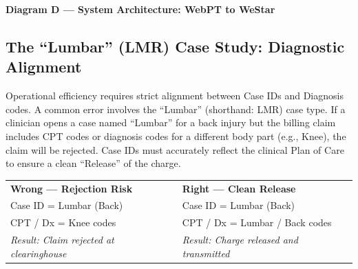 \documentclass[11pt,a4paper]{article}
\begin{document}
\vspace{0.4em}
\begin{center}
\textbf{\color{AccentTeal}Diagram D --- System Architecture: WebPT to WeStar}\\[0.5em]
\end{center}

\subsection{The ``Lumbar'' (LMR) Case Study: Diagnostic Alignment}

Operational efficiency requires strict alignment between Case IDs and Diagnosis codes. A common error involves the ``Lumbar'' (shorthand: LMR) case type. If a clinician opens a case named ``Lumbar'' for a back injury but the billing claim includes CPT codes or diagnosis codes for a different body part (e.g., Knee), the claim will be rejected. Case IDs must accurately reflect the clinical Plan of Care to ensure a clean ``Release'' of the charge.

\begin{tcolorbox}[dangerbox,title={Diagram F --- LMR Case Alignment: Wrong vs.\ Right}]
\begin{tabularx}{\linewidth}{@{}X X@{}}
  \textcolor{DangerRed}{\bfseries Wrong --- Rejection Risk} &
  \textcolor{SuccessGreen}{\bfseries Right --- Clean Release} \\[0.4em]
  Case ID = Lumbar (Back) &
  Case ID = Lumbar (Back) \\
  CPT / Dx = Knee codes &
  CPT / Dx = Lumbar / Back codes \\
  \textit{Result: Claim rejected at clearinghouse} &
  \textit{Result: Charge released and transmitted} \\
\end{tabularx}
\end{tcolorbox}
\end{document}
